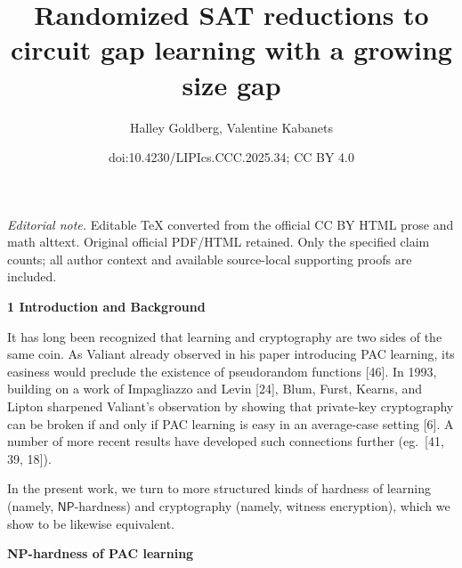 \documentclass[10pt,a4paper]{article}
\title{Randomized SAT reductions to circuit gap learning with a growing size gap}
\author{Halley Goldberg, Valentine Kabanets}
\date{doi:10.4230/LIPIcs.CCC.2025.34; CC BY 4.0}
\begin{document}
\maketitle
\noindent\textit{Editorial note.} Editable TeX converted from the official CC BY HTML prose and math alttext. Original official PDF/HTML retained. Only the specified claim counts; all author context and available source-local supporting proofs are included.\par\medskip


\par\medskip\noindent\textbf{
1 Introduction and Background}\par




It has long been recognized that learning and cryptography are two sides of the same coin. As Valiant already observed in his paper introducing PAC learning, its easiness would preclude the existence of pseudorandom functions [46]. In 1993, building on a work of Impagliazzo and Levin [24], Blum, Furst, Kearns, and Lipton sharpened Valiant’s observation by showing that private-key cryptography can be broken if and only if PAC learning is easy in an average-case setting [6]. A number of more recent results have developed such connections further (eg. [41, 39, 18]).\par




In the present work, we turn to more structured kinds of hardness of learning (namely, ${\mathsf{NP}}$-hardness) and cryptography (namely, witness encryption), which we show to be likewise equivalent.\par




\par\medskip\noindent\textbf{NP-hardness of PAC learning}\par
\end{document}
